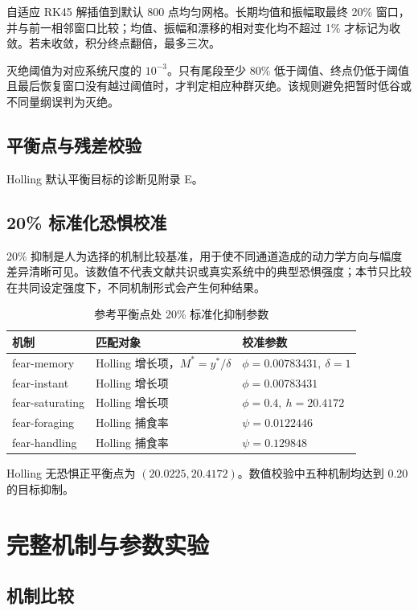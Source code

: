 \documentclass[12pt,a4paper]{ctexart}
\begin{document}
自适应 RK45 解插值到默认 800 点均匀网格。长期均值和振幅取最终 20\% 窗口，并与前一相邻窗口比较；均值、振幅和漂移的相对变化均不超过 1\% 才标记为收敛。若未收敛，积分终点翻倍，最多三次。

灭绝阈值为对应系统尺度的 $10^{-3}$。只有尾段至少 80\% 低于阈值、终点仍低于阈值且最后恢复窗口没有越过阈值时，才判定相应种群灭绝。该规则避免把暂时低谷或不同量纲误判为灭绝。

\subsection{平衡点与残差校验}

Holling 默认平衡目标的诊断见附录 E。

\subsection{20\% 标准化恐惧校准}

20\% 抑制是人为选择的机制比较基准，用于使不同通道造成的动力学方向与幅度差异清晰可见。该数值不代表文献共识或真实系统中的典型恐惧强度；本节只比较在共同设定强度下，不同机制形式会产生何种结果。

\begin{table}[H]
 \centering
 \caption{参考平衡点处 20\% 标准化抑制参数}
 \label{tab:equiv-params}
 \small
 \begin{tabular}{lll}
  \toprule
  机制 & 匹配对象 & 校准参数\\
  \midrule
  fear-memory & Holling 增长项，$M^*=y^*/\delta$ & $\phi=0.00783431,\ \delta=1$\\
  fear-instant & Holling 增长项 & $\phi=0.00783431$\\
  fear-saturating & Holling 增长项 & $\phi=0.4,\ h=20.4172$\\
  fear-foraging & Holling 捕食率 & $\psi=0.0122446$\\
  fear-handling & Holling 捕食率 & $\psi=0.129848$\\
  \bottomrule
 \end{tabular}
\end{table}

Holling 无恐惧正平衡点为 $(20.0225,20.4172)$。数值校验中五种机制均达到 0.20 的目标抑制。

\section{完整机制与参数实验}

\subsection{机制比较}
\end{document}
